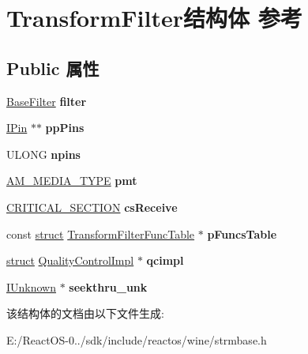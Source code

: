 \hypertarget{struct_transform_filter}{}\section{Transform\+Filter结构体 参考}
\label{struct_transform_filter}
\subsection*{Public 属性}
\begin{DoxyCompactItemize}
\item 
\mbox{\label{struct_transform_filter_a145f420a3356547f77fca705090027a2}} 
\hyperlink{struct_base_filter}{Base\+Filter} {\bfseries filter}
\item 
\mbox{\label{struct_transform_filter_a272b9639941e7020edb69059934c80ca}} 
\hyperlink{interface_i_pin}{I\+Pin} $\ast$$\ast$ {\bfseries pp\+Pins}
\item 
\mbox{\label{struct_transform_filter_a7c259da4344d4744450710ffcfddfef2}} 
U\+L\+O\+NG {\bfseries npins}
\item 
\mbox{\label{struct_transform_filter_ac8daebff53b91ec3abb5ab16a95f606c}} 
\hyperlink{struct_a_m___m_e_d_i_a___t_y_p_e}{A\+M\+\_\+\+M\+E\+D\+I\+A\+\_\+\+T\+Y\+PE} {\bfseries pmt}
\item 
\mbox{\label{struct_transform_filter_abf5a6d18f44cfdcd66a947f204ae272a}} 
\hyperlink{struct___c_r_i_t_i_c_a_l___s_e_c_t_i_o_n}{C\+R\+I\+T\+I\+C\+A\+L\+\_\+\+S\+E\+C\+T\+I\+ON} {\bfseries cs\+Receive}
\item 
\mbox{\label{struct_transform_filter_ab783317d55794bbd3e141347ae686dba}} 
const \hyperlink{interfacestruct}{struct} \hyperlink{struct_transform_filter_func_table}{Transform\+Filter\+Func\+Table} $\ast$ {\bfseries p\+Funcs\+Table}
\item 
\mbox{\label{struct_transform_filter_abaf17cbc719176828e5c478b9c5a1d9b}} 
\hyperlink{interfacestruct}{struct} \hyperlink{struct_quality_control_impl}{Quality\+Control\+Impl} $\ast$ {\bfseries qcimpl}
\item 
\mbox{\label{struct_transform_filter_afd35f30e34271bc6e76fb8bb58536d7b}} 
\hyperlink{interface_i_unknown}{I\+Unknown} $\ast$ {\bfseries seekthru\+\_\+unk}
\end{DoxyCompactItemize}


该结构体的文档由以下文件生成\+:\begin{DoxyCompactItemize}
\item 
E\+:/\+React\+O\+S-\/0../sdk/include/reactos/wine/strmbase.\+h\end{DoxyCompactItemize}
